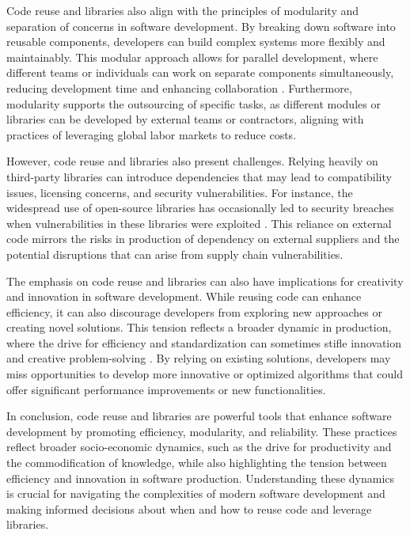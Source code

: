 \begin{refsection}
Code reuse and libraries also align with the principles of modularity and separation of concerns in software development. By breaking down software into reusable components, developers can build complex systems more flexibly and maintainably. This modular approach allows for parallel development, where different teams or individuals can work on separate components simultaneously, reducing development time and enhancing collaboration \cite[pp.~85-87]{Martin2022}. Furthermore, modularity supports the outsourcing of specific tasks, as different modules or libraries can be developed by external teams or contractors, aligning with practices of leveraging global labor markets to reduce costs.

However, code reuse and libraries also present challenges. Relying heavily on third-party libraries can introduce dependencies that may lead to compatibility issues, licensing concerns, and security vulnerabilities. For instance, the widespread use of open-source libraries has occasionally led to security breaches when vulnerabilities in these libraries were exploited \cite[pp.~78-80]{Pressman2019}. This reliance on external code mirrors the risks in production of dependency on external suppliers and the potential disruptions that can arise from supply chain vulnerabilities.

The emphasis on code reuse and libraries can also have implications for creativity and innovation in software development. While reusing code can enhance efficiency, it can also discourage developers from exploring new approaches or creating novel solutions. This tension reflects a broader dynamic in production, where the drive for efficiency and standardization can sometimes stifle innovation and creative problem-solving \cite[pp.~76-79]{Fowler1999}. By relying on existing solutions, developers may miss opportunities to develop more innovative or optimized algorithms that could offer significant performance improvements or new functionalities.

In conclusion, code reuse and libraries are powerful tools that enhance software development by promoting efficiency, modularity, and reliability. These practices reflect broader socio-economic dynamics, such as the drive for productivity and the commodification of knowledge, while also highlighting the tension between efficiency and innovation in software production. Understanding these dynamics is crucial for navigating the complexities of modern software development and making informed decisions about when and how to reuse code and leverage libraries.


\end{refsection}
